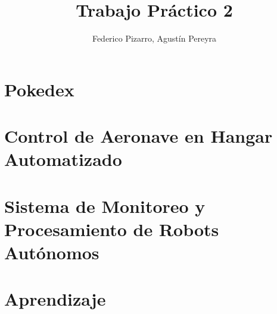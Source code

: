 \documentclass{article}
\title{Trabajo Práctico 2}
\author{Federico Pizarro, Agustín Pereyra}
\begin{document}
\maketitle
\begin{multicols}{2}

\section{Pokedex}


\section{Control de Aeronave en Hangar Automatizado}


\section{Sistema de Monitoreo y Procesamiento de Robots Autónomos}
\section*{Aprendizaje}
\end{multicols}
\end{document}
